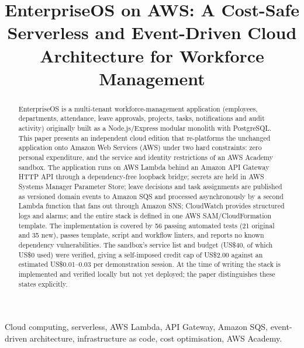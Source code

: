 \documentclass[conference]{IEEEtran}
\begin{document}
\sloppy

\title{EnterpriseOS on AWS: A Cost-Safe Serverless and Event-Driven Cloud Architecture for Workforce Management}

\author{
\and
{}
\and
{}
\and
{}
}

\maketitle

\begin{abstract}
EnterpriseOS is a multi-tenant workforce-management application (employees, departments,
attendance, leave approvals, projects, tasks, notifications and audit activity) originally
built as a Node.js/Express modular monolith with PostgreSQL. This paper presents an
independent cloud edition that re-platforms the unchanged application onto Amazon Web
Services (AWS) under two hard constraints: zero personal expenditure, and the service and
identity restrictions of an AWS Academy sandbox. The application runs on AWS Lambda behind
an Amazon API Gateway HTTP API through a dependency-free loopback bridge; secrets are held
in AWS Systems Manager Parameter Store; leave decisions and task assignments are published as
versioned domain events to Amazon SQS and processed asynchronously by a second Lambda function
that fans out through Amazon SNS; CloudWatch provides structured logs and alarms; and the
entire stack is defined in one AWS SAM/CloudFormation template. The implementation is covered
by 56 passing automated tests (21 original and 35 new), passes template, script and workflow
linters, and reports no known dependency vulnerabilities. The sandbox's service list and
budget (US\$40, of which US\$0 used) were verified, giving a self-imposed credit cap of
US\$2.00 against an estimated US\$0.01--0.03 per demonstration session. At the time of
writing the stack is implemented and verified locally but not yet deployed; the paper
distinguishes these states explicitly.
\end{abstract}

\begin{IEEEkeywords}
Cloud computing, serverless, AWS Lambda, API Gateway, Amazon SQS, event-driven architecture,
infrastructure as code, cost optimisation, AWS Academy.
\end{IEEEkeywords}
\end{document}
